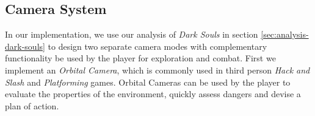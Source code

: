


\subsection{Camera System}
\label{sec:lock-on-camera}

In our implementation, we use our analysis of \emph{Dark Souls} in section \ref{sec:analysis-dark-souls} to design two separate camera modes with complementary functionality be used by the player for exploration and combat. First we implement an \emph{Orbital Camera}, which is commonly used in third person \emph{Hack and Slash} and \emph{Platforming} games. Orbital Cameras can be used by the player to evaluate the properties of the environment, quickly assess dangers and devise a plan of action.

